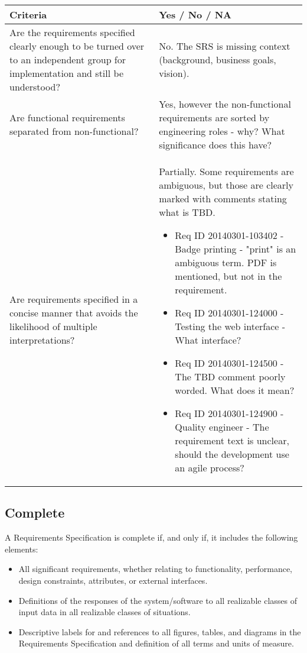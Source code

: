 \documentclass[Main]{subfiles}
\begin{document}
\begin{longtable}{p{8cm} | p{7.3cm}}
\textbf{Criteria} & \textbf{Yes / No / NA} \\ \hline

Are the requirements specified clearly enough to be turned over to an independent group for implementation and still be understood? & No. The SRS is missing context (background, business goals, vision). \\ \hline

Are functional requirements separated from non-functional? & Yes, however the non-functional requirements are sorted by engineering roles - why? What significance does this have? \\ \hline

Are requirements specified in a concise manner that avoids the likelihood of multiple interpretations? & Partially. Some requirements are ambiguous, but those are clearly marked with comments stating what is TBD.
\begin{itemize}
\item Req ID 20140301-103402 - Badge printing - "print" is an ambiguous term. PDF is mentioned, but not in the requirement.
\item Req ID 20140301-124000 - Testing the web interface - What interface?
\item Req ID 20140301-124500 - The TBD comment poorly worded. What does it mean?
\item Req ID 20140301-124900 - Quality engineer - The requirement text is unclear, should the development use an agile process? 
\end{itemize} \\ \hline


\end{longtable}

\subsection{Complete}
A Requirements Specification is complete if, and only if, it includes the following elements:
\begin{itemize}
\item All significant requirements, whether relating to functionality, performance, design constraints, attributes, or external interfaces.
\item Definitions of the responses of the system/software to all realizable classes of input data in all realizable classes of situations.
\item Descriptive labels for and references to all figures, tables, and diagrams in the Requirements Specification and definition of all terms and units of measure.

\end{itemize}
\end{document}
